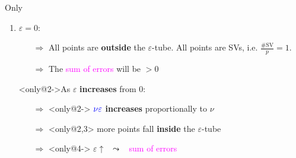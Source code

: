\begin{frame}{Only}
\begin{enumerate}
\item<only@1> $\varepsilon = 0$:
\begin{itemize}
\item[$\Rightarrow$] All points are \textbf{outside} the $\varepsilon$-tube. All points are SVs, i.e. $\frac{\#\mathrm{SV}}{p}=1$.
\item[$\Rightarrow$] The \textcolor{magenta}{sum of errors} will be $> 0$
\end{itemize}
\pause
\item[]<only@2->As $\varepsilon$ \textbf{increases} from $0$:
\begin{itemize}
\item[$\Rightarrow$]<only@2-> ${\color{blue}\nu\varepsilon}$ \textbf{increases} proportionally to $\nu$
\item[$\Rightarrow$]<only@2,3> more points fall \textbf{inside} the $\varepsilon$-tube
\item[$\Rightarrow$]<only@4->  
$\varepsilon \uparrow \;\;\leadsto\;\;$ \textcolor{magenta}{sum of errors} \slidesonly{$\downarrow$}




\end{itemize}
\end{enumerate}
\end{frame}
